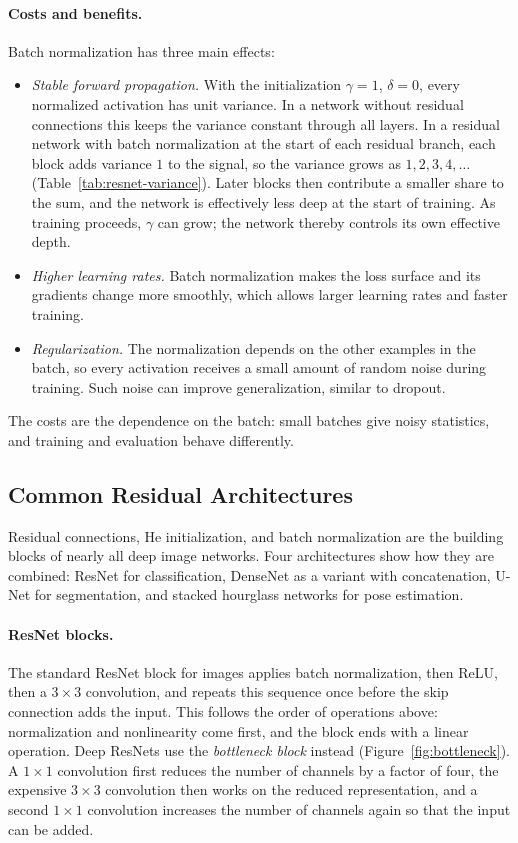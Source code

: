 \paragraph{Costs and benefits.}
Batch normalization has three main effects:
\begin{itemize}
  \item \emph{Stable forward propagation.} With the initialization
        $\gamma = 1$, $\delta = 0$, every normalized activation has unit
        variance. In a network without residual connections this keeps the
        variance constant through all layers. In a residual network with batch
        normalization at the start of each residual branch, each block adds
        variance $1$ to the signal, so the variance grows as $1, 2, 3, 4, \ldots$
        (Table~\ref{tab:resnet-variance}). Later blocks then contribute a
        smaller share to the sum, and the network is effectively less deep at
        the start of training. As training proceeds, $\gamma$ can grow; the
        network thereby controls its own effective depth.
  \item \emph{Higher learning rates.} Batch normalization makes the loss
        surface and its gradients change more smoothly, which allows larger
        learning rates and faster training.
  \item \emph{Regularization.} The normalization depends on the other examples
        in the batch, so every activation receives a small amount of random
        noise during training. Such noise can improve generalization, similar
        to dropout.
\end{itemize}
\noindent
The costs are the dependence on the batch: small batches give noisy
statistics, and training and evaluation behave differently.

\subsection{Common Residual Architectures}

Residual connections, He initialization, and batch normalization are the building
blocks of nearly all deep image networks. Four architectures show how they are
combined: ResNet for classification, DenseNet as a variant with concatenation,
U-Net for segmentation, and stacked hourglass networks for pose estimation.

\paragraph{ResNet blocks.}
The standard ResNet block for images applies batch normalization, then ReLU,
then a $3\times3$ convolution, and repeats this sequence once before the skip
connection adds the input. This follows the order of operations above:
normalization and nonlinearity come first, and the block ends with a linear
operation. Deep ResNets use the \emph{bottleneck block} instead
(Figure~\ref{fig:bottleneck}). A $1\times1$ convolution first reduces the number
of channels by a factor of four, the expensive $3\times3$ convolution then works
on the reduced representation, and a second $1\times1$ convolution increases the
number of channels again so that the input can be added.

